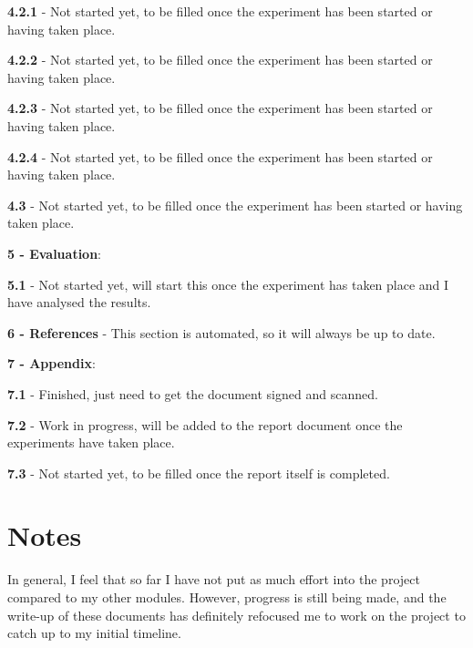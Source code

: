 \documentclass[abstract=on,12pt]{scrreprt}
\begin{document}
			\textbf{4.2.1} - Not started yet, to be filled once the experiment has been started or having taken place.
			
			\textbf{4.2.2} - Not started yet, to be filled once the experiment has been started or having taken place.
			
			\textbf{4.2.3} - Not started yet, to be filled once the experiment has been started or having taken place.
			
			\textbf{4.2.4} - Not started yet, to be filled once the experiment has been started or having taken place.
			
			\textbf{4.3} - Not started yet, to be filled once the experiment has been started or having taken place.
			
	
			\textbf{5 - Evaluation}:
			
			\textbf{5.1} - Not started yet, will start this once the experiment has taken place and I have analysed the results.
			
	
			\textbf{6 - References} - This section is automated, so it will always be up to date.
			
	 
			\textbf{7 - Appendix}:
			
			\textbf{7.1} - Finished, just need to get the document signed and scanned.
			
			\textbf{7.2} - Work in progress, will be added to the report document once the experiments have taken place.
			
			\textbf{7.3} - Not started yet, to be filled once the report itself is completed.
		
		\section*{Notes}
			In general, I feel that so far I have not put as much effort into the project compared to my other modules. However, progress is still being made, and the write-up of these documents has definitely refocused me to work on the project to catch up to my initial timeline.
		

\end{document}
